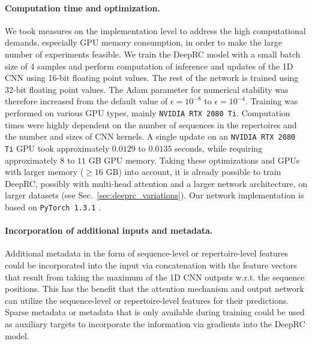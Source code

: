 \documentclass[oneside]{book}
\begin{document}
%

\paragraph{Computation time and optimization.}
%
We took measures on the implementation level to address the high computational demands, especially GPU memory consumption, in order to make the large number of experiments feasible.
We train the DeepRC model with a small batch size of $4$ samples
and perform computation of inference and updates of the 1D CNN using 16-bit floating point values.
The rest of the network is trained using 32-bit floating point values.
The Adam parameter for numerical stability was therefore
increased from the default value of $\epsilon=10^{-8}$ to $\epsilon=10^{-4}$.
Training was performed on various GPU types,
mainly \texttt{NVIDIA RTX 2080 Ti}.
Computation times were highly dependent on the number of sequences in the repertoires
and the number and sizes of CNN kernels.
A single update on an \texttt{NVIDIA RTX 2080 Ti} GPU took approximately $0.0129$ to $0.0135$ seconds,
while requiring approximately $8$ to $11$ GB GPU memory.
Taking these optimizations and 
GPUs with larger memory ($\geq16$ GB) into account,
it is already possible to train DeepRC,
possibly with multi-head attention and a larger network architecture,
on larger datasets (see Sec.~\ref{sec:deeprc_variations}).
Our network implementation is based on \texttt{PyTorch 1.3.1} \citep{paszke2019pytorch}.

\paragraph{Incorporation of additional inputs and metadata.}
Additional metadata in the form of sequence-level or repertoire-level features
could be incorporated into the input
via concatenation with the feature vectors that result from
taking the maximum of the 1D CNN outputs w.r.t. the sequence positions.
This has the benefit that
the attention mechanism and output network can utilize the sequence-level or repertoire-level features for their predictions.
Sparse metadata or metadata that is only available during training
could be used as auxiliary targets
to incorporate the information via gradients into the DeepRC model.
\end{document}
